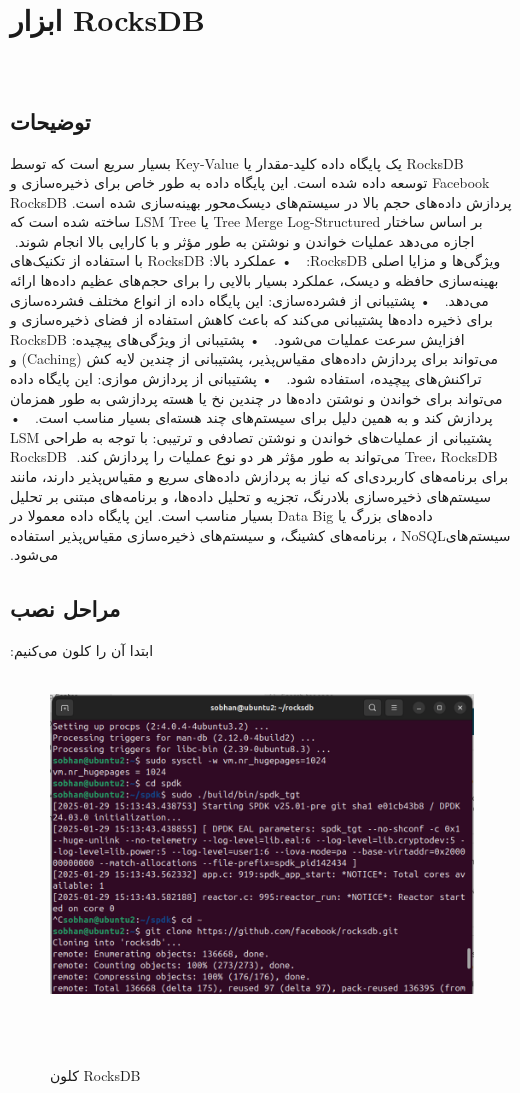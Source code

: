‫‫\section{ابزار RocksDB}
‫\subsection*{توضیحات}
‫RocksDB یک پایگاه داده کلید-مقدار یا Key-Value  بسیار سریع است که توسط Facebook توسعه داده شده است. این پایگاه داده به طور خاص برای ذخیره‌سازی و پردازش داده‌های حجم بالا در سیستم‌های دیسک‌محور بهینه‌سازی شده است. RocksDB بر اساس ساختار Tree Merge Log-Structured یا LSM Tree ساخته شده است که اجازه می‌دهد عملیات خواندن و نوشتن به طور مؤثر و با کارایی بالا انجام شوند.
‫
‫ویژگی‌ها و مزایا اصلی RocksDB:
‫
‫    • عملکرد بالا: RocksDB با استفاده از تکنیک‌های بهینه‌سازی حافظه و دیسک، عملکرد بسیار بالایی را برای حجم‌های عظیم داده‌ها ارائه می‌دهد.
‫
‫    • پشتیبانی از فشرده‌سازی: این پایگاه داده از انواع مختلف فشرده‌سازی برای ذخیره داده‌ها پشتیبانی می‌کند که باعث کاهش استفاده از فضای ذخیره‌سازی و افزایش سرعت عملیات می‌شود.
‫
‫    • پشتیبانی از ویژگی‌های پیچیده: RocksDB می‌تواند برای پردازش داده‌های مقیاس‌پذیر، پشتیبانی از چندین لایه کش (Caching) و تراکنش‌های پیچیده، استفاده شود.
‫
‫    • پشتیبانی از پردازش موازی: این پایگاه داده می‌تواند برای خواندن و نوشتن داده‌ها در چندین نخ یا هسته پردازشی به طور همزمان پردازش کند و به همین دلیل برای سیستم‌های چند هسته‌ای بسیار مناسب است.
‫
‫    • پشتیبانی از عملیات‌های خواندن و نوشتن تصادفی و ترتیبی: با توجه به طراحی LSM Tree، RocksDB می‌تواند به طور مؤثر هر دو نوع عملیات را پردازش کند.
‫
‫RocksDB برای برنامه‌های کاربردی‌ای که نیاز به پردازش داده‌های سریع و مقیاس‌پذیر دارند، مانند سیستم‌های ذخیره‌سازی بلادرنگ، تجزیه و تحلیل داده‌ها، و برنامه‌های مبتنی بر تحلیل داده‌های بزرگ یا Data Big بسیار مناسب است. این پایگاه داده معمولا در سیستم‌هایNoSQL ، برنامه‌های کشینگ، و سیستم‌های ذخیره‌سازی مقیاس‌پذیر استفاده می‌شود.
‫
‫‫\subsection*{مراحل نصب}
‫ابتدا آن را کلون می‌کنیم:
‫
‫\begin{figure}[H]
‫    \centering
‫    \includegraphics[width=\textwidth]{figs/1.png}
‫    \caption{کلون RocksDB}
‫\end{figure}
